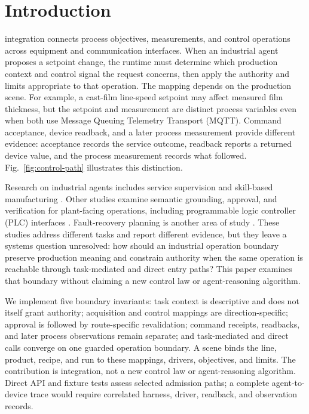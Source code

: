 \documentclass[journal]{IEEEtran}
\begin{document}
\section{Introduction}
 integration connects process objectives, measurements, and control operations across equipment and communication interfaces. When an industrial agent proposes a setpoint change, the runtime must determine which production context and control signal the request concerns, then apply the authority and limits appropriate to that operation. The mapping depends on the production scene. For example, a cast-film line-speed setpoint may affect measured film thickness, but the setpoint and measurement are distinct process variables even when both use Message Queuing Telemetry Transport (MQTT). Command acceptance, device readback, and a later process measurement provide different evidence: acceptance records the service outcome, readback reports a returned device value, and the process measurement records what followed. Fig.~\ref{fig:control-path} illustrates this distinction.



Research on industrial agents includes service supervision and skill-based manufacturing \cite{biskupovic2025supervision,koehle2026llmdriven}. Other studies examine semantic grounding, approval, and verification for plant-facing operations, including programmable logic controller (PLC) interfaces \cite{graul2026aas,schall2026safe}. Fault-recovery planning is another area of study \cite{vyas2026detection}. These studies address different tasks and report different evidence, but they leave a systems question unresolved: how should an industrial operation boundary preserve production meaning and constrain authority when the same operation is reachable through task-mediated and direct entry paths? This paper examines that boundary without claiming a new control law or agent-reasoning algorithm.

We implement five boundary invariants: task context is descriptive and does not itself grant authority; acquisition and control mappings are direction-specific; approval is followed by route-specific revalidation; command receipts, readbacks, and later process observations remain separate; and task-mediated and direct calls converge on one guarded operation boundary. A scene binds the line, product, recipe, and run to these mappings, drivers, objectives, and limits. The contribution is integration, not a new control law or agent-reasoning algorithm. Direct API and fixture tests assess selected admission paths; a complete agent-to-device trace would require correlated harness, driver, readback, and observation records.
\end{document}

